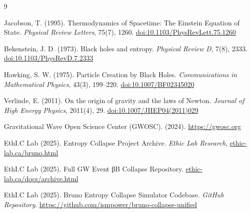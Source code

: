 \documentclass[12pt]{article}
\begin{document}
\begin{thebibliography}{9}

    Jacobson, T. (1995). Thermodynamics of Spacetime: The Einstein Equation of State. \textit{Physical Review Letters}, 75(7), 1260. \href{https://doi.org/10.1103/PhysRevLett.75.1260}{doi:10.1103/PhysRevLett.75.1260}
    
    Bekenstein, J. D. (1973). Black holes and entropy. \textit{Physical Review D}, 7(8), 2333. \href{https://doi.org/10.1103/PhysRevD.7.2333}{doi:10.1103/PhysRevD.7.2333}
    
    Hawking, S. W. (1975). Particle Creation by Black Holes. \textit{Communications in Mathematical Physics}, 43(3), 199–220. \href{https://doi.org/10.1007/BF02345020}{doi:10.1007/BF02345020}
    
    Verlinde, E. (2011). On the origin of gravity and the laws of Newton. \textit{Journal of High Energy Physics}, 2011(4), 29. \href{https://doi.org/10.1007/JHEP04(2011)029}{doi:10.1007/JHEP04(2011)029}
    
    Gravitational Wave Open Science Center (GWOSC). (2024). \href{https://gwosc.org}{https://gwosc.org}
    
    EthI.C Lab (2025). Entropy Collapse Project Archive. \textit{Ethic Lab Research}, \href{https://www.ethic-lab.ca/bruno.html}{ethic-lab.ca/bruno.html}
    
    EthI.C Lab (2025). Full GW Event βB Collapse Repository. \href{https://www.ethic-lab.ca/docs/archive.html}{ethic-lab.ca/docs/archive.html}
    
    EthI.C Lab (2025). Bruno Entropy Collapse Simulator Codebase. \textit{GitHub Repository}. \url{https://github.com/ismpower/bruno-collapse-unified}
    
    \end{thebibliography}
    
\end{document}
